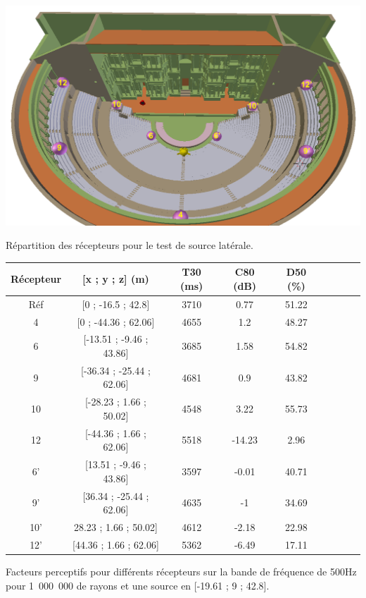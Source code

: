 \begin{figureth}
	\includegraphics[width=0.9\linewidth]{images/sourcelat}
	\caption{Répartition des récepteurs pour le test de source latérale.}
	\label{sourcelat}
\end{figureth}

\begin{tableth} 
 \begin{tabular}{| *{9}{c|}} 
 \hline 
 Récepteur & [x ; y ; z] (m)  & \gls{T30} (ms) & \gls{C80} (dB) & \gls{D50} (\%)  \\ 
 \hline 
 \hline 
 Réf    &[0 ; -16.5 ; 42.8] &3710  &0.77  &51.22  \\
 \hline 
  4  &  [0 ; -44.36 ; 62.06] &4655  &1.2  &48.27  \\
 \hline 
 \hline
 6  &  [-13.51 ; -9.46 ; 43.86] &3685  &1.58  &54.82  \\%
  \hline 
 9  & [-36.34 ; -25.44 ; 62.06] &4681  &0.9  &43.82  \\%
 \hline 
 \hline
 10  &  [-28.23 ; 1.66 ; 50.02] &4548  &3.22  &55.73  \\%
 \hline 
12   & [-44.36 ; 1.66 ; 62.06] &5518  &-14.23  &2.96  \\%
 \hline  
 \hline
 6'  &  [13.51 ; -9.46 ; 43.86] &3597  &-0.01  &40.71  \\%
  \hline 
 9'  & [36.34 ; -25.44 ; 62.06] &4635  &-1  &34.69  \\%
 \hline 
 \hline
 10'  &  28.23 ; 1.66 ; 50.02] &4612  &-2.18  &22.98  \\
 \hline 
12'   & [44.36 ; 1.66 ; 62.06] &5362  &-6.49  &17.11  \\%
 \hline 
\end{tabular} 
 \caption{Facteurs perceptifs pour différents récepteurs sur la bande de fréquence de 500Hz pour 1~000~000 de rayons et une source en [-19.61 ; 9 ; 42.8].} 
 \label{tab_fac_rec_sourcelat} 
 \end{tableth}

